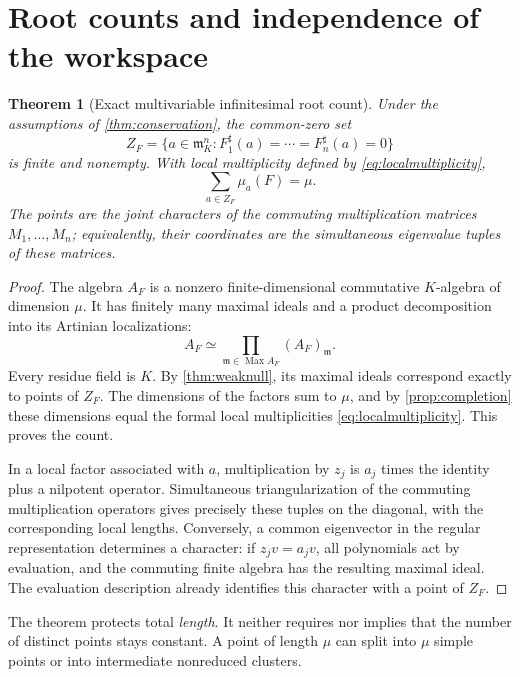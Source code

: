 \documentclass[11pt]{article}
\newtheorem{theorem}{Theorem}[section]
\theoremstyle{definition}
\newcommand{\mm}{\mathfrak m}
\newcommand{\Max}{\operatorname{Max}}
\newcommand{\sh}{^{\sharp}}
\begin{document}
\section{Root counts and independence of the workspace}\label{sec:roots}
\begin{theorem}[Exact multivariable infinitesimal root count]\label{thm:rootcount}
Under the assumptions of \cref{thm:conservation}, the common-zero set
\[
 Z_F=\{a\in\mm_K^n:F_1\sh(a)=\cdots=F_n\sh(a)=0\}
\]
is finite and nonempty. With local multiplicity defined by \eqref{eq:localmultiplicity},
\begin{equation}\label{eq:rootcount}
 \sum_{a\in Z_F}\mu_a(F)=\mu.
\end{equation}
The points are the joint characters of the commuting multiplication matrices $M_1,\ldots,M_n$; equivalently, their coordinates are the simultaneous eigenvalue tuples of these matrices.
\end{theorem}
\begin{proof}
The algebra $A_F$ is a nonzero finite-dimensional commutative $K$-algebra of dimension $\mu$. It has finitely many maximal ideals and a product decomposition into its Artinian localizations:
\[
 A_F\simeq\prod_{\mathfrak m\in\Max A_F}(A_F)_{\mathfrak m}.
\]
Every residue field is $K$. By \cref{thm:weaknull}, its maximal ideals correspond exactly to points of $Z_F$. The dimensions of the factors sum to $\mu$, and by \cref{prop:completion} these dimensions equal the formal local multiplicities \eqref{eq:localmultiplicity}. This proves the count.

In a local factor associated with $a$, multiplication by $z_j$ is $a_j$ times the identity plus a nilpotent operator. Simultaneous triangularization of the commuting multiplication operators gives precisely these tuples on the diagonal, with the corresponding local lengths. Conversely, a common eigenvector in the regular representation determines a character: if $z_jv=a_jv$, all polynomials act by evaluation, and the commuting finite algebra has the resulting maximal ideal. The evaluation description already identifies this character with a point of $Z_F$.
\end{proof}
The theorem protects total \emph{length}. It neither requires nor implies that the number of distinct points stays constant. A point of length $\mu$ can split into $\mu$ simple points or into intermediate nonreduced clusters.
\end{document}
